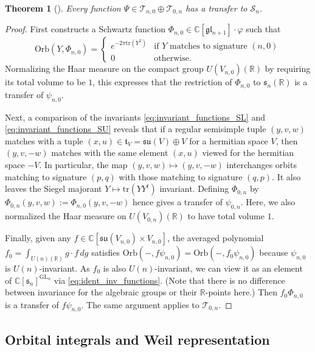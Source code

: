 \documentclass[reqno, 11pt]{amsart} %
\numberwithin{equation}{section}
\theoremstyle{plain}
\newtheorem{theorem}{Theorem}[section]
\theoremstyle{definition}
\theoremstyle{remark}
\newcommand{\tr}{\mathrm{tr}}
\newcommand{\mbC}{\mathbb{C}}
\newcommand{\mbR}{\mathbb{R}}
\newcommand{\mcS}{\mathcal{S}}
\newcommand{\mcT}{\mathcal{T}}
\newcommand{\mfg}{\mathfrak{g}}
\newcommand{\mfl}{\mathfrak{l}}
\newcommand{\mfs}{\mathfrak{s}}
\newcommand{\mfu}{\mathfrak{u}}
\newcommand{\mfgl}{\mfg\mfl}
\newcommand{\mfsu}{\mfs\mfu}
\newcommand{\lie}[1]{ \mathfrak{#1}}
\DeclareMathOperator{\GL}{GL}
\newcommand{\Orb}{\mathrm{Orb}}
\begin{document}
\begin{theorem}[]\label{thm:pos_def}
Every function $Ψ\in \mcT_{n,0} \oplus \mcT_{0,n}$ has a transfer to $\mcS_n$.
\end{theorem}
\begin{proof}
First \cite[Theorem 4.15]{MSY} constructs a Schwartz function $Φ_{n,0}\in \mbC[\mfgl_{n+1}]\cdot φ$
such that
$$\Orb(Y, Φ_{n,0}) = \begin{cases}
e^{-2π\tr(Y^2)} & \text{if $Y$ matches to signature $(n,0)$}\\
0 & \text{otherwise.}
\end{cases}$$
Normalizing the Haar measure on the compact group $U(V_{n,0})(\mbR)$ by requiring its total volume to be $1$, this expresses that the restriction of $Φ_{n,0}$ to $\mfs_n(\mbR)$ is a transfer of $ψ_{n,0}$.

Next, a comparison of the invariants \eqref{eq:invariant_functions_SL} and \eqref{eq:invariant_functions_SU} reveals that if a regular semisimple tuple $(y,v,w)$ matches with a tuple $(x, u) \in \lie t_V = \lie{su}(V) \oplus V$ for a hermitian space $V$, then $(y,v,-w)$ matches with the same element $(x,u)$ viewed for the hermitian space $-V$. In particular, the map $(y,v,w) \mapsto (y, v , -w)$ interchanges orbits matching to signature $(p,q)$ with those matching to signature $(q,p)$. It also leaves the Siegel majorant $Y\mapsto \tr(YY^t)$ invariant. Defining $Φ_{0,n}$ by $Φ_{0,n}(y, v, w) := Φ_{n,0}(y, v, -w)$ hence gives a transfer of $ψ_{0,n}$. Here, we also normalized the Haar measure on $U(V_{0,n})(\mbR)$ to have total volume $1$.

Finally, given any $f \in \mbC[\mfsu(V_{n,0}) \times V_{n,0}]$, the averaged polynomial $f_0 = \int_{U(n)(\mbR)} g\cdot f\, dg$ satisfies $\Orb(-,fψ_{n,0}) = \Orb(-,f_0ψ_{n,0})$ because $ψ_{n,0}$ is $U(n)$-invariant. As $f_0$ is also $U(n)$-invariant, we can view it as an element of $\mbC[\lie s_n]^{\GL_n}$ via \eqref{eq:ident_inv_functions}. (Note that there is no difference between invariance for the algebraic groups or their $\mbR$-points here.) Then $f_0 Φ_{n,0}$ is a transfer of $f ψ_{n,0}$. The same argument applies to $\mcT_{0,n}$.
\end{proof}


\subsection{Orbital integrals and Weil representation}
\label{sec:Weil rep transfer}
\end{document}
